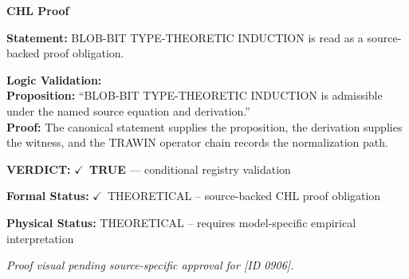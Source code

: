 \vspace{0.45em}
\noindent\textbf{CHL Proof}\par
\textbf{Statement:} BLOB-BIT TYPE-THEORETIC INDUCTION is read as a source-backed proof obligation.

\textbf{Logic Validation:}\\
\textbf{Proposition:} ``BLOB-BIT TYPE-THEORETIC INDUCTION is admissible under the named source equation and derivation.''\\
\textbf{Proof:} The canonical statement supplies the proposition, the derivation supplies the witness, and the TRAWIN operator chain records the normalization path.

\textbf{VERDICT:} \ensuremath{\checkmark}\ \textbf{TRUE} --- conditional registry validation

\textbf{Formal Status:} \ensuremath{\checkmark}\ THEORETICAL -- source-backed CHL proof obligation

\textbf{Physical Status:} THEORETICAL -- requires model-specific empirical interpretation
\par\vspace{0.45em}
\par
\vfill
\begingroup\footnotesize\itshape
Proof visual pending source-specific approval for [ID 0906].
\par\endgroup
\vfill
\endgroup
\endgroup
